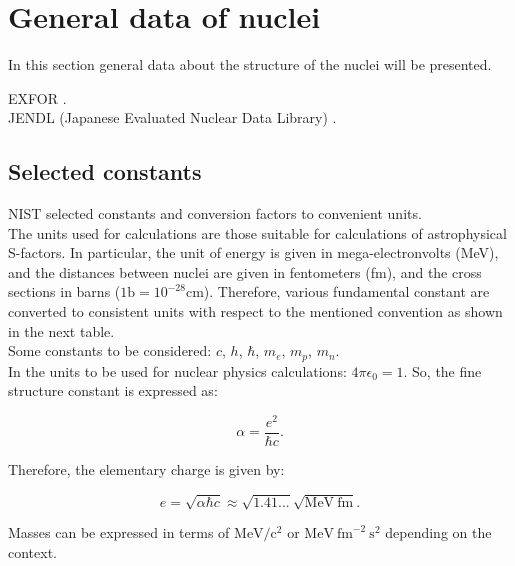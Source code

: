 \documentclass[openany]{book}
\begin{document}
\section{General data of nuclei} \label{sec:nucleiData}

In this section general data about the structure of the nuclei will be presented. 

EXFOR \cite{zerkin_pritychenko_totans_vrapcenjak_rodionov_shulyak_2022}. \\
JENDL (Japanese Evaluated Nuclear Data Library) \cite{iwamoto_iwamoto_shibata_ichihara_kunieda_minato_nakayama_2020}.

\subsection{Selected constants} \label{sub:selectedConstants}

NIST selected constants and conversion factors to convenient units. \\

The units used for calculations are those suitable for calculations of astrophysical S-factors. In particular, the unit of energy is given in mega-electronvolts (MeV), and the distances between nuclei are given in fentometers (fm), and the cross sections in barns ($\mathrm{1b = 10^{-28}cm}$). Therefore, various fundamental constant are converted to consistent units with respect to the mentioned convention as shown in the next table. \\

Some constants to be considered: $c$, $h$, $\hbar$, $m_e$, $m_p$, $m_n$. \\

In the units to be used for nuclear physics calculations: $4\pi\epsilon_0 = 1$. So, the fine structure constant is expressed as:

\begin{equation} \label{eq:constants_alpha}
	\alpha = \frac{e^2}{\hbar c}.
\end{equation}

Therefore, the elementary charge is given by: 

\begin{equation} \label{eq:constants_e}
	e = \sqrt{\alpha\hbar c} \approx \sqrt{1.41...} \sqrt{\mathrm{MeV \ fm}}.
\end{equation}

Masses can be expressed in terms of $\mathrm{MeV/c^2}$ or $\mathrm{MeV \ {fm}^{-2} \ s^{2}}$ depending on the context.  
\end{document}
